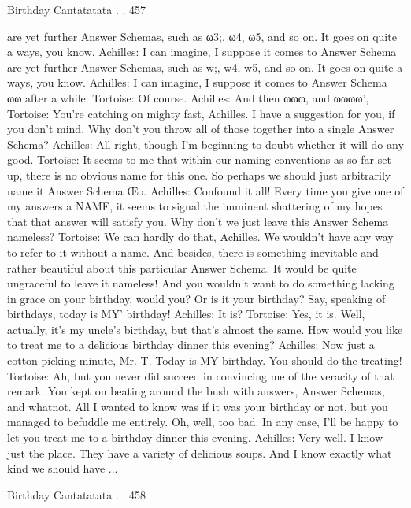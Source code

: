 Birthday Cantatatata . .                                                               457

   are yet further Answer Schemas, such as ω3;, ω4, ω5, and so on. It goes on quite a
   ways, you know.
Achilles: I can imagine, I suppose it comes to Answer Schema are yet further Answer
   Schemas, such as w;, w4, w5, and so on. It goes on quite a ways, you know.
Achilles: I can imagine, I suppose it comes to Answer Schema ωω after a while.
Tortoise: Of course.
Achilles: And then ωωω, and ωωωω',
Tortoise: You're catching on mighty fast, Achilles. I have a suggestion for you, if you
   don't mind. Why don't you throw all of those together into a single Answer Schema?
Achilles: All right, though I'm beginning to doubt whether it will do any good.
Tortoise: It seems to me that within our naming conventions as so far set up, there is no
   obvious name for this one. So perhaps we should just arbitrarily name it Answer
   Schema Œo.
Achilles: Confound it all! Every time you give one of my answers a NAME, it seems to
   signal the imminent shattering of my hopes that that answer will satisfy you. Why
   don't we just leave this Answer Schema nameless?
Tortoise: We can hardly do that, Achilles. We wouldn't have any way to refer to it
   without a name. And besides, there is something inevitable and rather beautiful about
   this particular Answer Schema. It would be quite ungraceful to leave it nameless! And
   you wouldn't want to do something lacking in grace on your birthday, would you? Or
   is it your birthday? Say, speaking of birthdays, today is MY' birthday!
Achilles:       It is?
Tortoise: Yes, it is. Well, actually, it's my uncle's birthday, but that's almost the same.
   How would you like to treat me to a delicious birthday dinner this evening?
Achilles: Now just a cotton-picking minute, Mr. T. Today is MY birthday. You should do
   the treating!
Tortoise: Ah, but you never did succeed in convincing me of the veracity of that remark.
   You kept on beating around the bush with answers, Answer Schemas, and whatnot.
   All I wanted to know was if it was your birthday or not, but you managed to befuddle
   me entirely. Oh, well, too bad. In any case, I'll be happy to let you treat me to a
   birthday dinner this evening.
Achilles: Very well. I know just the place. They have a variety of delicious soups. And I
   know exactly what kind we should have ...




Birthday Cantatatata . .                                                               458


